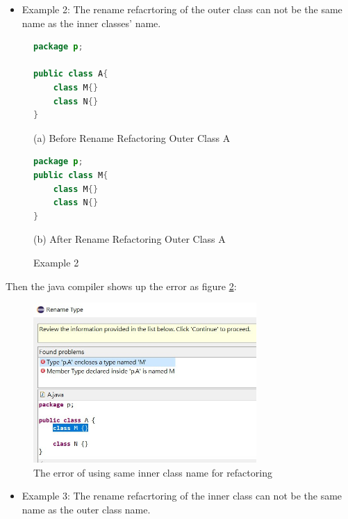 \begin{itemize}
\item Example 2: The rename refacrtoring of the outer class can not be the same name as the inner classes' name.
\end{itemize}

\begin{figure}[th]
\centering
\begin{minipage}[t]{0.6\linewidth}
\begin{lstlisting}[language=java, basicstyle=\scriptsize\ttfamily,frame=single]
package p;

public class A{	
    class M{}
    class N{}
} 
\end{lstlisting}
\tiny{(a) Before Rename Refactoring Outer Class A}
\end{minipage}
\hfill


\begin{minipage}[t]{0.6\linewidth}
\begin{lstlisting}[language=java, basicstyle=\scriptsize\ttfamily,frame=single]
package p;
public class M{	
    class M{}
    class N{}
} 
\end{lstlisting}
\tiny{(b) After Rename Refactoring Outer Class A}
\end{minipage}
\caption{Example 2}
\label{fig:nestedclass2}
\end{figure}

Then the java compiler shows up the error as figure \ref{fig:NC2}:

\begin{figure}[H]
\centerline{\includegraphics[width=85mm,scale=0.5]{NC2.jpg}}
\caption{The error of using same inner class name for refactoring}
\label{fig:NC2}
\end{figure}

\begin{itemize}
\item Example 3: The rename refacrtoring of the inner class can not be the same name as the  outer class name.
\end{itemize}

